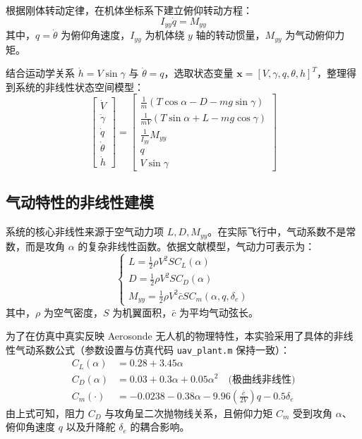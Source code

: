\documentclass[UTF8, a4paper, 12pt]{ctexart}
\begin{document}
根据刚体转动定律，在机体坐标系下建立俯仰转动方程：
\begin{equation}
    I_{yy} \dot{q} = M_{yy}
\end{equation}
其中，$q = \dot{\theta}$ 为俯仰角速度，$I_{yy}$ 为机体绕 $y$ 轴的转动惯量，$M_{yy}$ 为气动俯仰力矩。

结合运动学关系 $\dot{h} = V \sin\gamma$ 与 $\dot{\theta} = q$，选取状态变量 $\mathbf{x} = [V, \gamma, q, \theta, h]^T$，整理得到系统的非线性状态空间模型：
\begin{equation} \label{eq:model_full}
    \left[ \begin{array}{c} \dot{V} \\ \dot{\gamma} \\ \dot{q} \\ \dot{\theta} \\ \dot{h} \end{array} \right] = 
    \left[ \begin{array}{c}
        \frac{1}{m}(T \cos\alpha - D - mg \sin\gamma) \\
        \frac{1}{mV}(T \sin\alpha + L - mg \cos\gamma) \\
        \frac{1}{I_{yy}} M_{yy} \\
        q \\
        V \sin\gamma
    \end{array} \right]
\end{equation}

\subsection{气动特性的非线性建模}
系统的核心非线性来源于空气动力项 $L, D, M_{yy}$。在实际飞行中，气动系数不是常数，而是攻角 $\alpha$ 的复杂非线性函数。依据文献模型，气动力可表示为：
\begin{equation}
    \begin{cases}
        L = \frac{1}{2} \rho V^2 S C_L(\alpha) \\
        D = \frac{1}{2} \rho V^2 S C_D(\alpha) \\
        M_{yy} = \frac{1}{2} \rho V^2 \bar{c} S C_m(\alpha, q, \delta_e)
    \end{cases}
\end{equation}
其中，$\rho$ 为空气密度，$S$ 为机翼面积，$\bar{c}$ 为平均气动弦长。

为了在仿真中真实反映 Aerosonde 无人机的物理特性，本实验采用了具体的非线性气动系数公式（参数设置与仿真代码 \texttt{uav\_plant.m} 保持一致）：
\begin{align}
    C_L(\alpha) &= 0.28 + 3.45 \alpha \\
    C_D(\alpha) &= 0.03 + 0.3 \alpha + 0.05 \alpha^2 \quad \text{(极曲线非线性)} \\
    C_m(\cdot) &= -0.0238 - 0.38 \alpha - 9.96 \left( \frac{\bar{c}}{2V} \right) q - 0.5 \delta_e
\end{align}
由上式可知，阻力 $C_D$ 与攻角呈二次抛物线关系，且俯仰力矩 $C_m$ 受到攻角 $\alpha$、俯仰角速度 $q$ 以及升降舵 $\delta_e$ 的耦合影响。
\end{document}
